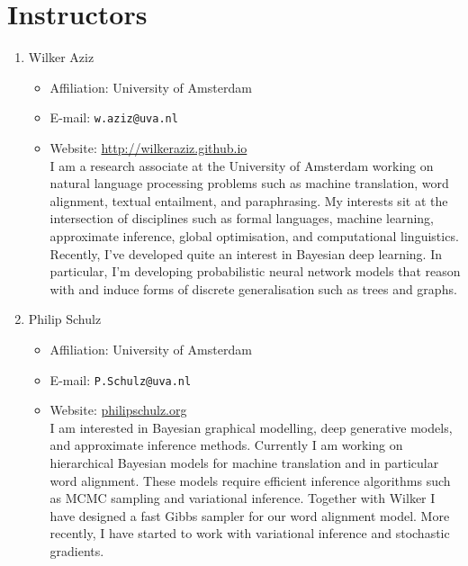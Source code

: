\section{Instructors}

\begin{enumerate}
\item Wilker Aziz
\begin{itemize}
\item Affiliation: University of Amsterdam
\item E-mail: \texttt{w.aziz@uva.nl}
\item Website: \url{http://wilkeraziz.github.io}\\
I am a research associate at the University of Amsterdam working on natural language processing problems such as machine translation, word alignment, textual entailment, and paraphrasing. My interests sit at the intersection of disciplines such as formal languages, machine learning, approximate inference, global optimisation, and computational linguistics.
Recently, I've developed quite an interest in Bayesian deep learning. In particular, I'm developing probabilistic neural network models that reason with and induce forms of discrete generalisation such as trees and graphs.
\end{itemize}
\item Philip Schulz
\begin{itemize}
\item Affiliation: University of Amsterdam
\item E-mail: \texttt{P.Schulz@uva.nl}
\item Website: \url{philipschulz.org}\\
I am interested in Bayesian graphical modelling, deep generative models, and approximate inference methods. Currently I am working on hierarchical Bayesian models for machine translation and in particular word alignment. These models require efficient inference algorithms such as MCMC sampling and variational inference. Together with Wilker I have designed a fast Gibbs sampler for our word alignment model. More recently, I have started to work with variational inference and stochastic gradients. 
\end{itemize}
\end{enumerate}